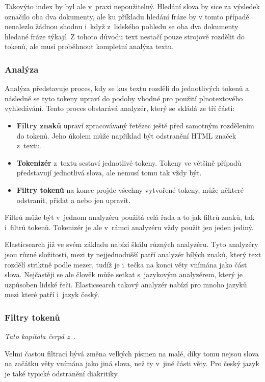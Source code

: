 Takovýto index by byl ale v~praxi nepoužitelný. Hledání slova  by sice za výsledek označilo oba dva dokumenty, ale ku příkladu hledání fráze  by v tomto případě nenalezlo žádnou shodnu i~když z~lidského pohledu se oba dva dokumenty hledané fráze týkají. Z tohoto důvodu text nestačí pouze strojově rozdělit do tokenů, ale musí proběhnout kompletní analýza textu.

\subsubsection*{Analýza}
Analýza představuje proces, kdy se kus textu rozdělí do jednotlivých tokenů a následně se tyto tokeny upraví do podoby vhodné pro použití plnotextového vyhledávání. Tento proces obstarává analyzér, který se skládá ze tří části:
\begin{itemize}
    \item \textbf{Filtry znaků} upraví zpracovávaný řetězec ještě před samotným rozdělením do tokenů. Jeho úkolem může například být odstranění HTML značek z~textu.
    \item \textbf{Tokenizér} z~textu sestaví jednotlivé tokeny. Tokeny ve většině případů představují jednotlivá slova, ale nemusí tomu tak vždy být. 
    \item \textbf{Filtry tokenů} na konec projde všechny vytvořené tokeny, může některé odstranit, přidat a nebo jen upravit. 
\end{itemize}
Filtrů může být v~jednom analyzéru použitá celá řada a to jak filtrů znaků, tak i~filtrů tokenů. Tokenizér je ale v~rámci analyzéru vždy použit jen jeden jediný.

Elasticsearch již ve svém základu nabízí škálu různých analyzéru. Tyto analyzéry jsou různé složitosti, mezi ty nejjednodušší patří analyzér bílých znaků, který text rozdělí striktně podle mezer, tudíž je i~tečka na konci věty vnímána jako část slova. Nejčastěji se ale člověk může setkat s~jazykovým analyzérem, který je uzpůsoben lidské řeči. Elasticsearch takový analyzér nabízí pro mnoho jazyků mezi které patří i~jazyk český.

\subsubsection*{Filtry tokenů}
\emph{Tato kapitola čerpá z~\cite{bib:elastic-fulltext}}.

Velmi častou filtrací bývá změna velkých písmen na malé, díky tomu nejsou slova na začátku věty vnímána jako jiná slova, než ty v~jiné části věty. Pro český jazyk je také typické odstranění diakritiky.

